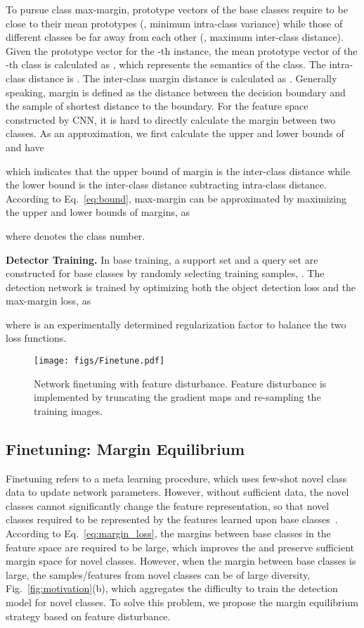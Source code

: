\documentclass[final]{cvpr}
\begin{document}
To pursue class max-margin, prototype vectors of the base classes require to be close to their mean prototypes (, minimum intra-class variance) while those of different classes be far away from each other (, maximum inter-class distance). Given the prototype vector  for the -th instance, the mean prototype vector of the -th class is calculated as , which represents the semantics of the class. The intra-class distance is . The inter-class margin distance is calculated as  . Generally speaking, margin is defined as the distance between the decision boundary and the sample of shortest distance to the boundary. For the feature space constructed by CNN, it is hard to directly calculate the margin  between two classes. As an approximation, we first calculate the upper and lower bounds of  and have

which indicates that the upper bound of margin is the inter-class distance while the lower bound is the inter-class distance subtracting intra-class distance. According to Eq.~\ref{eq:bound}, max-margin can be approximated by maximizing the upper and lower bounds of margins, as

where  denotes the class number.

\textbf{Detector Training.}
In base training, a support set and a query set are constructed for base classes by randomly selecting training samples, . The detection network is trained by optimizing both the object detection loss and the max-margin loss, as

where  is an experimentally determined regularization factor to balance the two loss functions.

\begin{figure}[t]
\centering
\texttt{[image: figs/Finetune.pdf]}
\caption{Network finetuning with feature disturbance. Feature disturbance is implemented by truncating the gradient maps and re-sampling the training images.}
\label{fig:flowchart_finetune}
\end{figure}

\subsection{Finetuning: Margin Equilibrium}
Finetuning refers to a meta learning procedure, which uses few-shot novel class data to update network parameters. However, without sufficient data, the novel classes cannot significantly change the feature representation, so that novel classes required to be represented by the features learned upon base classes~\cite{NegativeMargin}.  According to Eq.\ \ref{eq:margin_loss}, the margins between base classes in the feature space are required to be large, which improves the  and preserve sufficient margin space for novel classes. However, when the margin between base classes is large, the samples/features from novel classes can be of large diversity, Fig.\ \ref{fig:motivation}(b), which aggregates the difficulty to train the detection model for novel classes. To solve this problem, we propose the margin equilibrium strategy based on feature disturbance. 
\end{document}
